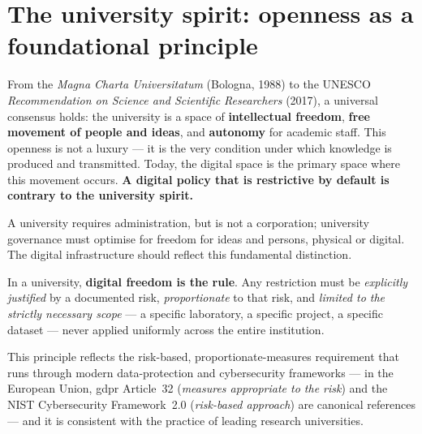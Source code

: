 \bigskip

\section{The university spirit: openness as a foundational principle}

From the \emph{Magna Charta Universitatum} (Bologna, 1988) to the UNESCO
\emph{Recommendation on Science and Scientific Researchers} (2017), a
universal consensus holds: the university is a space of \textbf{intellectual
freedom}, \textbf{free movement of people and ideas}, and
\textbf{autonomy} for academic staff. This openness is not a luxury ---
it is the very condition under which knowledge is produced and transmitted.
Today, the digital space is the primary space where this movement occurs.
\textbf{A digital policy that is restrictive by default
is contrary to the university spirit.}

\begin{principlebox}
A university requires administration, but is not a corporation;
university governance must optimise for freedom for ideas and persons,
physical or digital. The digital infrastructure should reflect this
fundamental distinction.

\smallskip
In a university, \textbf{digital freedom is the rule}. Any restriction must
be \emph{explicitly justified} by a documented risk, \emph{proportionate}
to that risk, and \emph{limited to the strictly necessary scope} --- a
specific laboratory, a specific project, a specific dataset --- never
applied uniformly across the entire institution.

\smallskip
This principle reflects the risk-based, proportionate-measures requirement
that runs through modern data-protection and cybersecurity frameworks --- in
the European Union, \gls{gdpr} Article~32 (\emph{measures appropriate to the
risk}) and the NIST Cybersecurity Framework~2.0 (\emph{risk-based approach})
are canonical references --- and it is consistent with the practice of leading
research universities.
\end{principlebox}


